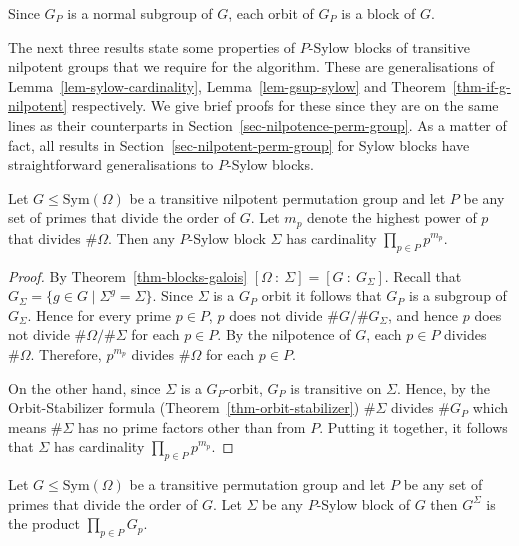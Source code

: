 \documentclass[prodmod,acmtalg]{acmsmall}
\newcommand{\Sym}[1]{{\ensuremath{\mathrm{Sym}\left(#1\right)}}}
\begin{document}
Since $G_P$ is a normal subgroup of $G$, each orbit of $G_P$ is a
block of $G$.

The next three results state some properties of $P$-Sylow blocks of
transitive nilpotent groups that we require for the algorithm. These
are generalisations of Lemma~\ref{lem-sylow-cardinality},
Lemma~\ref{lem-gsup-sylow} and Theorem~\ref{thm-if-g-nilpotent}
respectively. We give brief proofs for these since they are on the
same lines as their counterparts in
Section~\ref{sec-nilpotence-perm-group}. As a matter of fact, all
results in Section~\ref{sec-nilpotent-perm-group} for Sylow blocks
have straightforward generalisations to $P$-Sylow blocks.


\begin{lemma}\label{lem-gen-sylow-subblocks}
  Let $G\leq\Sym{\Omega}$ be a transitive nilpotent permutation group
  and let $P$ be any set of primes that divide the order of $G$. Let
  $m_p$ denote the highest power of $p$ that divides $\# \Omega$. Then
  any $P$-Sylow block $\Sigma$ has cardinality $\prod_{p\in P}
  p^{m_p}$.
\end{lemma}

\begin{proof}
  By Theorem~\ref{thm-blocks-galois}
  $[\Omega~:~\Sigma]=[G~:~G_\Sigma]$. Recall that $G_\Sigma=\{g\in
  G\mid \Sigma^g=\Sigma\}$. Since $\Sigma$ is a $G_P$ orbit it follows
  that $G_P$ is a subgroup of $G_\Sigma$. Hence for every prime $p\in
  P$, $p$ does not divide $\# G/\# G_\Sigma$, and hence $p$ does not
  divide $\# \Omega/\# \Sigma$ for each $p\in P$.  By the nilpotence
  of $G$, each $p\in P$ divides $\# \Omega$. Therefore, $p^{m_p}$
  divides $\# \Omega$ for each $p\in P$.

  On the other hand, since $\Sigma$ is a $G_P$-orbit, $G_P$ is
  transitive on $\Sigma$. Hence, by the Orbit-Stabilizer formula
  (Theorem~\ref{thm-orbit-stabilizer}) $\# \Sigma$ divides $\# G_P$
  which means $\# \Sigma$ has no prime factors other than from $P$.
  Putting it together, it follows that $\Sigma$ has cardinality
  $\prod_{p\in P} p^{m_p}$.
\end{proof}

\begin{lemma}\label{lem-gen-gsup-sylow}
  Let $G\leq\Sym{\Omega}$ be a transitive permutation group and let
  $P$ be any set of primes that divide the order of $G$. Let $\Sigma$
  be any $P$-Sylow block of $G$ then $G^\Sigma$ is the product
  $\prod_{p \in P} G_p$.
\end{lemma}
\end{document}
